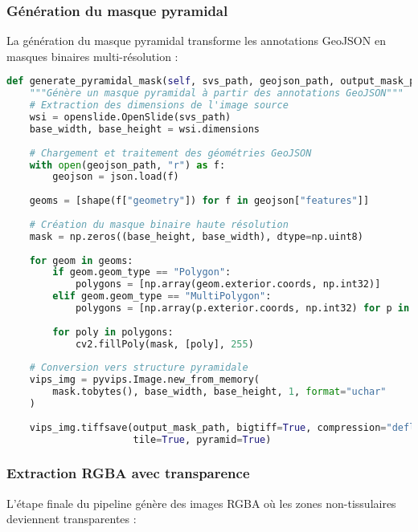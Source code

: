 \documentclass[12pt,a4paper]{report}
\begin{document}
\subsubsection{Génération du masque pyramidal}

La génération du masque pyramidal transforme les annotations GeoJSON en masques binaires multi-résolution :

\begin{lstlisting}[language=Python, caption=Génération de masque pyramidal]
def generate_pyramidal_mask(self, svs_path, geojson_path, output_mask_path):
    """Génère un masque pyramidal à partir des annotations GeoJSON"""
    # Extraction des dimensions de l'image source
    wsi = openslide.OpenSlide(svs_path)
    base_width, base_height = wsi.dimensions
    
    # Chargement et traitement des géométries GeoJSON
    with open(geojson_path, "r") as f:
        geojson = json.load(f)
    
    geoms = [shape(f["geometry"]) for f in geojson["features"]]
    
    # Création du masque binaire haute résolution
    mask = np.zeros((base_height, base_width), dtype=np.uint8)
    
    for geom in geoms:
        if geom.geom_type == "Polygon":
            polygons = [np.array(geom.exterior.coords, np.int32)]
        elif geom.geom_type == "MultiPolygon":
            polygons = [np.array(p.exterior.coords, np.int32) for p in geom.geoms]
        
        for poly in polygons:
            cv2.fillPoly(mask, [poly], 255)
    
    # Conversion vers structure pyramidale
    vips_img = pyvips.Image.new_from_memory(
        mask.tobytes(), base_width, base_height, 1, format="uchar"
    )
    
    vips_img.tiffsave(output_mask_path, bigtiff=True, compression="deflate", 
                      tile=True, pyramid=True)
\end{lstlisting}

\subsubsection{Extraction RGBA avec transparence}

L'étape finale du pipeline génère des images RGBA où les zones non-tissulaires deviennent transparentes :
\end{document}
